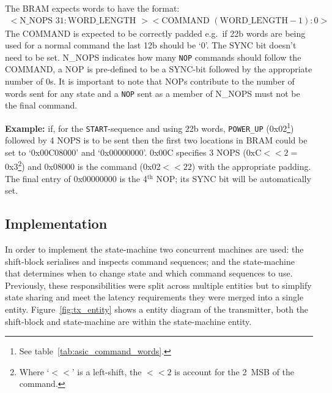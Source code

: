 The BRAM expects words to have the format:
\begin{align}\label{fmt:tx_bram}
  <\text{N\_NOPS } 31:\text{WORD\_LENGTH }><\text{COMMAND } (\text{WORD\_LENGTH} - 1):0>
\end{align}
The COMMAND is expected to be correctly padded e.g.\ if 22b words are being used for a normal command the last 12b should be `0'. The SYNC bit doesn't need to be set. N\_NOPS indicates how many \texttt{NOP} commands should follow the COMMAND, a NOP is pre-defined to be a SYNC-bit followed by the appropriate number of 0s. It is important to note that NOPs contribute to the number of words sent for any state and a \texttt{NOP} sent as a member of N\_NOPS must not be the final command.

\textbf{Example:} if, for the \texttt{START}-sequence and using 22b words, \texttt{POWER\_UP} (0x02\footnote{See table~\ref{tab:asic_command_words}.}) followed by 4 NOPS is to be sent then the first two locations in BRAM could be set to `0x00C08000' and `0x00000000'. 0x00C specifies 3 NOPS (\(\text{0xC}<<2 =\)0x3\footnote{Where `\(<<\)' is a left-shift, the \( <<2 \) is account for the 2~MSB of the command.}) and 0x08000 is the command (0x02\( << 22 \)) with the appropriate padding. The final entry of 0x00000000 is the 4\(^{\text{th}}\) NOP; its SYNC bit will be automatically set.
\subsection{Implementation} %
\label{sub:tx_implementation}

In order to implement the state-machine two concurrent machines are used: the shift-block serialises and inspects command sequences; and the state-machine that determines when to change state and which command sequences to use. Previously, these responsibilities were split across multiple entities but to simplify state sharing and meet the latency requirements they were merged into a single entity. Figure~\ref{fig:tx_entity} shows a entity diagram of the transmitter, both the shift-block and state-machine are within the state-machine entity.
    
